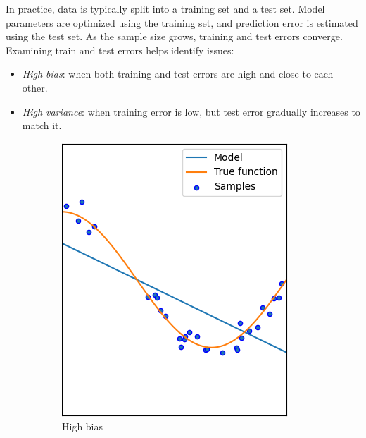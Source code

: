 In practice, data is typically split into a training set and a test set. 
Model parameters are optimized using the training set, and prediction error is estimated using the test set.
As the sample size grows, training and test errors converge. 
Examining train and test errors helps identify issues:
\begin{itemize}
    \item \textit{High bias}: when both training and test errors are high and close to each other.
    \item \textit{High variance}: when training error is low, but test error gradually increases to match it.
\end{itemize}
\begin{figure}[H]
    \centering
    \begin{subfigure}{0.32\textwidth}
        \centering
        \includegraphics[width=0.75\linewidth]{images/hb.png} 
        \caption{High bias}
    \end{subfigure}
    \begin{subfigure}{0.32\textwidth}
        \centering

\end{subfigure}
\end{figure}
